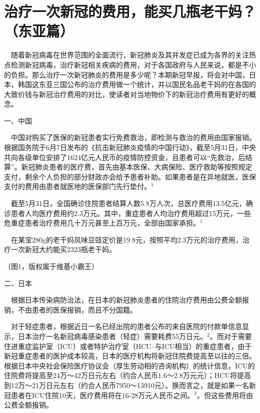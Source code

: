 \documentclass[
]{article}
\begin{document}
\vspace{-5mm}

\hypertarget{section}{%
\section{\texorpdfstring{\textcolor{glaucous}{\Huge 治疗一次新冠的费用，能买几瓶老干妈？（东亚篇）}}{}}\label{section}}

\vspace{-3mm}

\(\quad\)随着新冠病毒在世界范围的全面流行，新冠肺炎及其并发症已成为各界的关注热点检测新冠病毒，治疗新冠相关疾病的费用，对于各国政府与人民来说，都是不小的负担。那么治疗一次新冠肺炎的费用是多少呢？本期新冠早报，将会对中国，日本，韩国这东亚三国公布的治疗费用做一个统计，并以国民名品老干妈的在各国的大致价钱与新冠治疗费用的对比，使读者对当地物价下的新冠治疗费用有更好的概念。

一、中国

\(\quad\)中国对购买了医保的新冠患者实行免费救治，即检测与救治的费用由国家报销。根据国务院于6月7日发布的《抗击新冠肺炎疫情的中国行动》，截至5月31日，中央共向各级单位安排了1624亿元人民币的疫情防控资金，且患者可以``先救治，后结算''。新冠肺炎患者的医疗费，首先由基本医保、大病保险、医疗救助等按照规定支付，剩余个人负担的部分财政亦会给予患者补助。如果患者是在异地就医，医保支付的费用由患者就医地的医保部门先行垫付。\(^1\)

\(\quad\)截至5月31日，全国确诊住院患者结算人数5.8万人次，总医疗费用13.5亿元，确诊患者人均医疗费用约2.3万元。其中，重症患者人均治疗费用超过15万元，一些危重症患者治疗费用几十万元甚至上百万元，全部由国家承担。\(^1\)

\(\quad\)在某宝280g的老干妈风味豆豉定价是19.8元，按照平均2.3万元的治疗费用，治疗一次新冠大约能买2323瓶老干妈。

\vspace{5mm}

\Large （图1，版权属于维基小霸王）

二、日本

\(\quad\)根据日本传染病防治法，在日本的新冠肺炎患者的住院治疗费用由公费全额报销，不由患者的医保报销，而且不分国籍。

\(\quad\)对于轻症患者，根据近日一名已经出院的患者公布的来自医院的付款单信息显示，日本治疗一名新冠病毒感染患者（轻症）需要耗费55万日元。\(^2\)。而对于需要住进重症监护室（ICU）或者特护治疗室（HCU--与ICU相当）的重症患者，由于新冠重症患者的医护成本较高，日本的医疗机构将新冠住院费提高至以往的三倍。根据日本中央社会保险医疗协议会（厚生劳动相的咨询机构）的统计信息，ICU的住院费将提高至24万～42万日元左右（约合人民币1.6～2.8万元元）；HCU将提高到12万～21万日元左右（约合人民币7950～13910元）。换而言之，就是如果一名新冠患者在ICU住院10天，医疗费用将在16-28万元人民币之间。\(^3\)。但这些费用将由公费全额报销。
\end{document}
